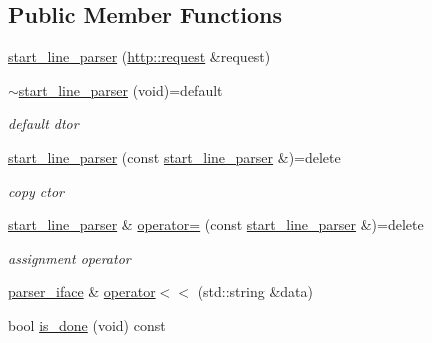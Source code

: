 \subsection*{Public Member Functions}
\begin{DoxyCompactItemize}
\item 
\hyperlink{classnetflex_1_1parsing_1_1start__line__parser_a8a8554f0cfedc23f4955f5fcd4fa2a30}{start\+\_\+line\+\_\+parser} (\hyperlink{classnetflex_1_1http_1_1request}{http\+::request} \&request)
\item 
\mbox{\label{classnetflex_1_1parsing_1_1start__line__parser_a7daf79346b3de62c031b0fe262196910}} 
\hyperlink{classnetflex_1_1parsing_1_1start__line__parser_a7daf79346b3de62c031b0fe262196910}{$\sim$start\+\_\+line\+\_\+parser} (void)=default
\begin{DoxyCompactList}\small\item\em default dtor \end{DoxyCompactList}\item 
\mbox{\label{classnetflex_1_1parsing_1_1start__line__parser_ae86a3442c52945efb4868c0853d89be7}} 
\hyperlink{classnetflex_1_1parsing_1_1start__line__parser_ae86a3442c52945efb4868c0853d89be7}{start\+\_\+line\+\_\+parser} (const \hyperlink{classnetflex_1_1parsing_1_1start__line__parser}{start\+\_\+line\+\_\+parser} \&)=delete
\begin{DoxyCompactList}\small\item\em copy ctor \end{DoxyCompactList}\item 
\mbox{\label{classnetflex_1_1parsing_1_1start__line__parser_a38a89b7c84cfcf444a519920f45b1b7e}} 
\hyperlink{classnetflex_1_1parsing_1_1start__line__parser}{start\+\_\+line\+\_\+parser} \& \hyperlink{classnetflex_1_1parsing_1_1start__line__parser_a38a89b7c84cfcf444a519920f45b1b7e}{operator=} (const \hyperlink{classnetflex_1_1parsing_1_1start__line__parser}{start\+\_\+line\+\_\+parser} \&)=delete
\begin{DoxyCompactList}\small\item\em assignment operator \end{DoxyCompactList}\item 
\hyperlink{classnetflex_1_1parsing_1_1parser__iface}{parser\+\_\+iface} \& \hyperlink{classnetflex_1_1parsing_1_1start__line__parser_a9a573ace2b0c41171e5dda3c16fa71e8}{operator$<$$<$} (std\+::string \&data)
\item 
bool \hyperlink{classnetflex_1_1parsing_1_1start__line__parser_a7b32cf1d39bfaa78d76dff258d984f95}{is\+\_\+done} (void) const
\end{DoxyCompactItemize}

